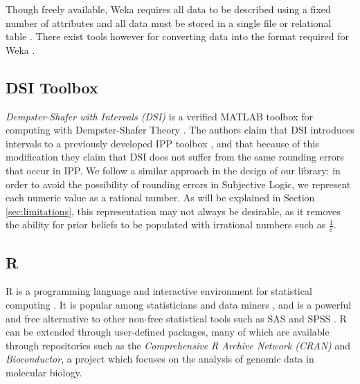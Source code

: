 \documentclass[thesis.tex]{subfiles}
\begin{document}
Though freely available, Weka requires all data to be described using a fixed number of attributes and all
data must be stored in a single file or relational table \cite{reutemann2005toolbox}. There exist tools however for converting data into
the format required for Weka \cite{reutemann2005toolbox}.





\subsection{DSI Toolbox}

\emph{Dempster-Shafer with Intervals (DSI)} is a verified MATLAB toolbox
for computing with Dempster-Shafer Theory \cite{auer2010verified}. The authors
claim that DSI introduces intervals to a previously developed IPP toolbox \cite{limbourg2007}, and that because of this
modification they claim that DSI does not suffer from the same rounding errors that occur in IPP.
We follow a similar approach in the design of our library: in order to avoid the possibility of rounding errors in Subjective Logic,
we represent each numeric value as a rational number. As will be explained in Section \ref{sec:limitations},
this representation may not always be desirable, as it removes the ability for prior beliefs to be populated
with irrational numbers such as $\frac{1}{e}$.








\subsection{R}

R is a programming language and interactive environment for statistical computing \cite{team2012r}.
It is popular among statisticians and data miners \cite{fox2005using, vance2009data}, and is a powerful
and free alternative to other non-free statistical tools
such as SAS \cite{delwiche2012little} and SPSS \cite{quintero2013workload}. R can be extended through
user-defined packages, many of which are available through repositories such as the \emph{Comprehensive R Archive Network (CRAN)}
and \emph{Bioconductor}, a project which focuses on the analysis of genomic data in molecular biology.
\end{document}
